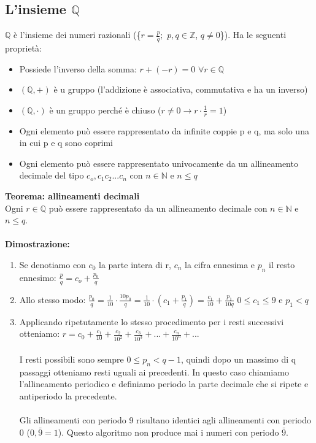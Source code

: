 \documentclass{article}
\begin{document}
\subsection{L'insieme $\mathds{Q}$}
$\mathds{Q}$ è l'insieme dei numeri razionali (\{$r=\frac{p}{q};$ $p,q \in \mathds{Z}$, $q \neq 0$\}). Ha le seguenti proprietà:
\begin{itemize}
    \item
    Possiede l'inverso della somma: $r + (-r) = 0$ $\forall r \in \mathds{Q}$
    \item
    $(\mathds{Q}, +)$ è u gruppo (l'addizione è associativa, commutativa e ha un inverso)
    \item
    $(\mathds{Q}, \cdot)$ è un gruppo perché è chiuso ($r \neq 0 \rightarrow r \cdot \frac{1}{r} = 1$)
    \item
    Ogni elemento può essere rappresentato da infinite coppie p e q, ma solo una in cui p e q sono coprimi
    \item
    Ogni elemento può essere rappresentato univocamente da un allineamento decimale del tipo $c_o, c_1 c_2 ... c_n$ con $n \in \mathds{N}$ e $n \leq q$
\end{itemize}
\textbf{Teorema: allineamenti decimali}\\
Ogni $r \in \mathds{Q}$ può essere rappresentato da un allineamento decimale con $n \in \mathds{N}$ e $n \leq q$.\\\\
\textbf{Dimostrazione:}
\begin{enumerate}
    \item
    Se denotiamo con $c_0$ la parte intera di r, $c_n$ la cifra ennesima e $p_n$ il resto ennesimo: $\frac{p}{q} = c_o + \frac{p_0}{q}$
    \item
    Allo stesso modo: $\frac{p_0}{q} = \frac{1}{10} \cdot \frac{10 p_0}{q} = \frac{1}{10} \cdot \left(c_1 + \frac{p_1}{q} \right) = \frac{c_1}{10} + \frac{p_1}{10q}$ \qquad $0 \leq c_1 \leq 9$ e $p_1 < q$
    \item
    Applicando ripetutamente lo stesso procedimento per i resti successivi otteniamo: $r = c_0 + \frac{c_1}{10} + \frac{c_2}{10^2} + \frac{c_3}{10^3} + ... + \frac{c_n}{10^n} + ...$ \\\\
    I resti possibili sono sempre $0 \leq p_n < q-1$, quindi dopo un massimo di q passaggi otteniamo resti uguali ai precedenti. In questo caso chiamiamo l'allineamento periodico e definiamo periodo la parte decimale che si ripete e antiperiodo la precedente.\\\\
    Gli allineamenti con periodo 9 risultano identici agli allineamenti con periodo 0 ($0,\bar{9} = 1$). Questo algoritmo non produce mai i numeri con periodo $\bar{9}$.

\end{enumerate}
\end{document}
